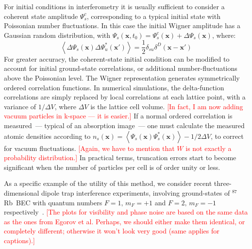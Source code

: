 \documentclass[aps,prl,twocolumn,showpacs,amsmath,amssymb,superscriptaddress]{revtex4-1}
\newcommand{\remark}[1]{\textcolor{red}{{[}#1{]}}}
\newcommand{\Rb}{$^{87}$Rb}
\begin{document}
{For initial conditions in interferometry it is usually sufficient
to consider a coherent state amplitude $\Psi_{s}^{c}$,
corresponding to a typical initial state with Poissonian number fluctuations.
In this case the initial Wigner amplitude has a Gaussian random distribution,
with $\Psi_{s}(\mathbf{x},t_{0})=\Psi_{s}^{c}(\mathbf{x})+\Delta\Psi_{s}(\mathbf{x})$,
where:
\begin{equation}
	\left\langle
		\Delta\Psi_{s}(\mathbf{x}) \Delta\Psi_{u}^{*}(\mathbf{x}')
	\right\rangle =
	\frac{1}{2} \delta_{su} \delta^{D} \left( \mathbf{x} - \mathbf{x}'\right)
\end{equation}
For greater accuracy, the coherent-state initial condition
can be modified to account for initial ground-state correlations,
or additional number-fluctuations above the Poissonian level.
The Wigner representation generates symmetrically ordered correlation functions.
In numerical simulations, the delta-function correlations are simply replaced by
local correlations at each lattice point,
with a variance of $1/\Delta V$, where $\Delta V$ is the lattice cell volume.
	\remark{In fact, I am now adding vacuum particles in k-space --- it is easier.}
If a normal ordered correlation is measured~--- typical of an absorption image~---
one must calculate the measured atomic densities according to
$n_{s} \left( \mathbf{x} \right) = \left\langle
	\Psi_{s}(\mathbf{x}) \Psi_{s}^{*}(\mathbf{x})
\right\rangle -1/2\Delta V$,
to correct for vacuum fluctuations.
	\remark{Again, we have to mention that $W$ is not exactly a probability distribution.}
In practical terms, truncation errors start to become significant
when the number of particles per cell is of order unity or less.

As a specific example of the utility of this method,
we consider recent three-dimensional dipole trap interference experiments,
involving ground-states of \Rb~BEC with quantum numbers $F=1,\, m_{F}=+1$
and $F=2,\, m_{F}=-1$ respectively~\cite{Egorov2010}.
	\remark{The plots for visibility and phase noise are based on the same data
	as the ones from Egorov et al.
	Perhaps, we should either make them identical, or completely different;
	otherwise it won't look very good (same applies for captions).}

}
\end{document}

